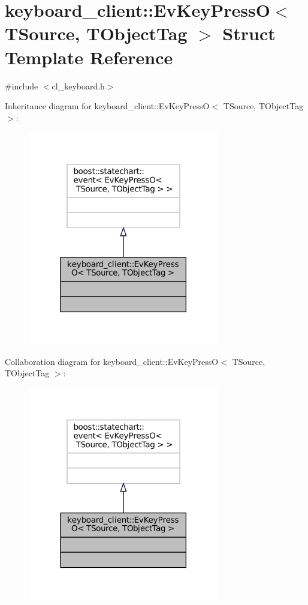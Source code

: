 \hypertarget{structkeyboard__client_1_1EvKeyPressO}{}\section{keyboard\+\_\+client\+:\+:Ev\+Key\+PressO$<$ T\+Source, T\+Object\+Tag $>$ Struct Template Reference}
\label{structkeyboard__client_1_1EvKeyPressO}


{\ttfamily \#include $<$cl\+\_\+keyboard.\+h$>$}



Inheritance diagram for keyboard\+\_\+client\+:\+:Ev\+Key\+PressO$<$ T\+Source, T\+Object\+Tag $>$\+:
\nopagebreak
\begin{figure}[H]
\begin{center}
\leavevmode
\includegraphics[width=237pt]{structkeyboard__client_1_1EvKeyPressO__inherit__graph}
\end{center}
\end{figure}


Collaboration diagram for keyboard\+\_\+client\+:\+:Ev\+Key\+PressO$<$ T\+Source, T\+Object\+Tag $>$\+:
\nopagebreak
\begin{figure}[H]
\begin{center}
\leavevmode
\includegraphics[width=237pt]{structkeyboard__client_1_1EvKeyPressO__coll__graph}
\end{center}
\end{figure}


